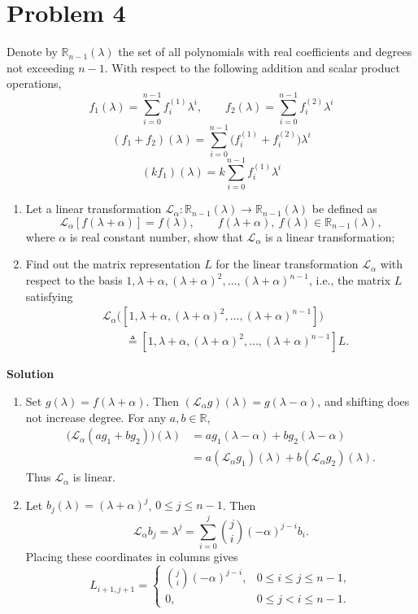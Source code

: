 \documentclass[UTF8,10pt,letterpaper,fontset=fandol]{ctexart}
\newcommand{\R}{\mathbb R}
\newcommand{\Solution}{\par\Needspace{5\baselineskip}\textbf{Solution}\par}
\begin{document}
\section{Problem 4}
Denote by \(\R_{n-1}(\lambda)\) the set of all polynomials with real coefficients
and degrees not exceeding \(n-1\).
With respect to the following addition and scalar product operations,
\[
f_1(\lambda)=\sum_{i=0}^{n-1}f_i^{(1)}\lambda^i,\qquad
f_2(\lambda)=\sum_{i=0}^{n-1}f_i^{(2)}\lambda^i
\]
\[
(f_1+f_2)(\lambda)=\sum_{i=0}^{n-1}
\bigl(f_i^{(1)}+f_i^{(2)}\bigr)\lambda^i
\]
\[
(kf_1)(\lambda)=k\sum_{i=0}^{n-1}f_i^{(1)}\lambda^i
\]
\begin{enumerate}
\item Let a linear transformation
\(\mathcal L_\alpha:\R_{n-1}(\lambda)\to\R_{n-1}(\lambda)\) be defined as
\[
\mathcal L_\alpha[f(\lambda+\alpha)]=f(\lambda),\qquad
f(\lambda+\alpha),\ f(\lambda)\in\R_{n-1}(\lambda),
\]
where \(\alpha\) is real constant number, show that
\(\mathcal L_\alpha\) is a linear transformation;
\item Find out the matrix representation \(L\) for the linear transformation
\(\mathcal L_\alpha\) with respect to the basis
\(1,\lambda+\alpha,(\lambda+\alpha)^2,\ldots,(\lambda+\alpha)^{n-1}\),
i.e., the matrix \(L\) satisfying
\[
\begin{aligned}
&\mathcal L_\alpha\bigl([1,\lambda+\alpha,(\lambda+\alpha)^2,\ldots,
(\lambda+\alpha)^{n-1}]\bigr)\\
&\qquad\mathrel{\triangleq}
[1,\lambda+\alpha,(\lambda+\alpha)^2,\ldots,(\lambda+\alpha)^{n-1}]L.
\end{aligned}
\]
\end{enumerate}

\Solution
\begin{enumerate}
\item Set \(g(\lambda)=f(\lambda+\alpha)\). Then
\((\mathcal L_\alpha g)(\lambda)=g(\lambda-\alpha)\), and shifting does not increase degree.
For any \(a,b\in\R\),
\[
\begin{aligned}
\bigl(\mathcal L_\alpha(ag_1+bg_2)\bigr)(\lambda)
&=ag_1(\lambda-\alpha)+bg_2(\lambda-\alpha)\\
&=a(\mathcal L_\alpha g_1)(\lambda)+b(\mathcal L_\alpha g_2)(\lambda).
\end{aligned}
\]
Thus \(\mathcal L_\alpha\) is linear.
\item Let \(b_j(\lambda)=(\lambda+\alpha)^j\), \(0\le j\le n-1\). Then
\[
\mathcal L_\alpha b_j=\lambda^j
=\sum_{i=0}^j\binom ji(-\alpha)^{j-i}b_i.
\]
Placing these coordinates in columns gives
\[
\boxed{L_{i+1,j+1}=\begin{cases}
\displaystyle\binom ji(-\alpha)^{j-i},&0\le i\le j\le n-1,\\
0,&0\le j<i\le n-1.
\end{cases}}
\]
\end{enumerate}
\end{document}
